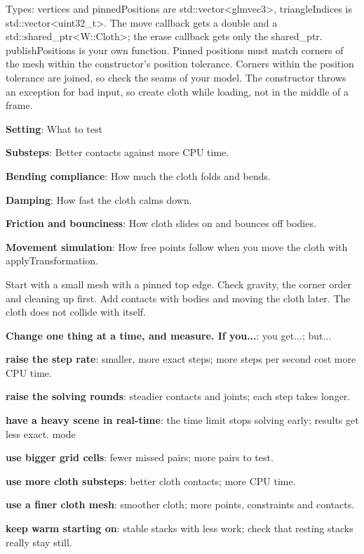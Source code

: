 \documentclass[11pt,a4paper]{article}
\begin{document}
Types: vertices and pinnedPositions are std::vector<glmvec3>, triangleIndices is std::vector<uint32\_t>. The move callback gets a double and a std::shared\_ptr<W::Cloth>; the erase callback gets only the shared\_ptr. publishPositions is your own function. Pinned positions must match corners of the mesh within the constructor's position tolerance. Corners within the position tolerance are joined, so check the seams of your model. The constructor throws an exception for bad input, so create cloth while loading, not in the middle of a frame.

\textbf{Setting}: What to test

\textbf{Substeps}: Better contacts against more CPU time.

\textbf{Bending compliance}: How much the cloth folds and bends.

\textbf{Damping}: How fast the cloth calms down.

\textbf{Friction and bounciness}: How cloth slides on and bounces off bodies.

\textbf{Movement simulation}: How free points follow when you move the cloth with applyTransformation.

Start with a small mesh with a pinned top edge. Check gravity, the corner order and cleaning up first. Add contacts with bodies and moving the cloth later. The cloth does not collide with itself.

\label{vpe-core-28}
\textbf{Change one thing at a time, and measure. If you...}: you get...; but...

\textbf{raise the step rate}: smaller, more exact steps; more steps per second cost more CPU time.

\textbf{raise the solving rounds}: steadier contacts and joints; each step takes longer.

\textbf{have a heavy scene in real-time}: the time limit stops solving early; results get less exact. mode

\textbf{use bigger grid cells}: fewer missed pairs; more pairs to test.

\textbf{use more cloth substeps}: better cloth contacts; more CPU time.

\textbf{use a finer cloth mesh}: smoother cloth; more points, constraints and contacts.

\textbf{keep warm starting on}: stable stacks with less work; check that resting stacks really stay still.
\end{document}
